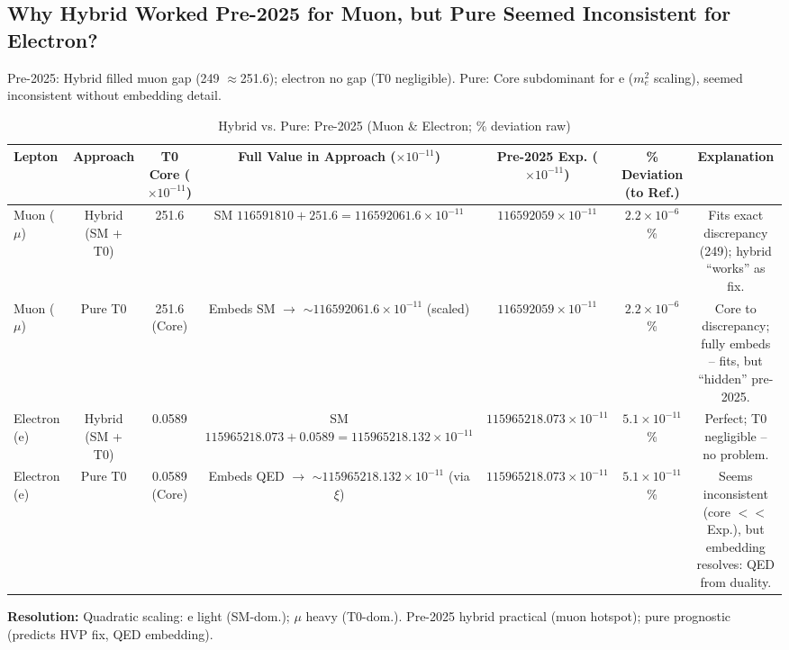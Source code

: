 \documentclass[12pt,a4paper]{article}
\begin{document}
	\subsection{Why Hybrid Worked Pre-2025 for Muon, but Pure Seemed Inconsistent for Electron?}
	
	Pre-2025: Hybrid filled muon gap (249 $\approx$251.6); electron no gap (T0 negligible). Pure: Core subdominant for e ($m_e^2$ scaling), seemed inconsistent without embedding detail.
	
	\begin{table}[ht!]
		\centering
		\small
		\begin{adjustbox}{max width=\textwidth}
			\begin{tabular}{lcccccc}
				\toprule
				Lepton & Approach & T0 Core ($ \times 10^{-11}$) & Full Value in Approach ($ \times 10^{-11}$) & Pre-2025 Exp. ($ \times 10^{-11}$) & \% Deviation (to Ref.) & Explanation \\
				\midrule
				Muon ($\mu$) & Hybrid (SM + T0) & 251.6 & SM $116591810 + 251.6 = 116592061.6 \times 10^{-11}$ & $116592059 \times 10^{-11}$ & $2.2 \times 10^{-6}$ \% & Fits exact discrepancy (249); hybrid ``works'' as fix. \\
				Muon ($\mu$) & Pure T0 & 251.6 (Core) & Embeds SM $\to$ $\sim 116592061.6 \times 10^{-11}$ (scaled) & $116592059 \times 10^{-11}$ & $2.2 \times 10^{-6}$ \% & Core to discrepancy; fully embeds -- fits, but ``hidden'' pre-2025. \\
				Electron (e) & Hybrid (SM + T0) & 0.0589 & SM $115965218.073 + 0.0589 = 115965218.132 \times 10^{-11}$ & $115965218.073 \times 10^{-11}$ & $5.1 \times 10^{-11}$ \% & Perfect; T0 negligible -- no problem. \\
				Electron (e) & Pure T0 & 0.0589 (Core) & Embeds QED $\to$ $\sim 115965218.132 \times 10^{-11}$ (via $\xi$) & $115965218.073 \times 10^{-11}$ & $5.1 \times 10^{-11}$ \% & Seems inconsistent (core $<<$ Exp.), but embedding resolves: QED from duality. \\
				\bottomrule
			\end{tabular}
		\end{adjustbox}
		\caption{Hybrid vs. Pure: Pre-2025 (Muon \& Electron; \% deviation raw)}
		\label{tab:hybrid_inconsistency}
	\end{table}
	
	\textbf{Resolution:} Quadratic scaling: e light (SM-dom.); $\mu$ heavy (T0-dom.). Pre-2025 hybrid practical (muon hotspot); pure prognostic (predicts HVP fix, QED embedding).
	
\end{document}
